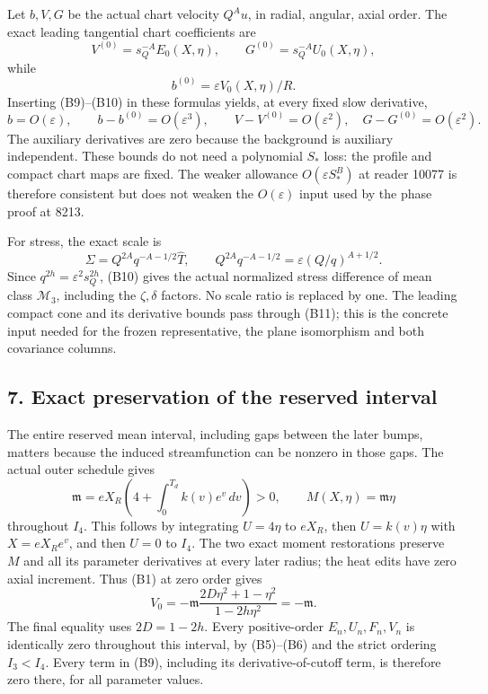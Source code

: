 \documentclass[10pt,a4paper]{article}
\begin{document}
Let \(b,V,G\) be the actual chart velocity \(Q^Au\), in radial, angular, axial order. The exact leading tangential chart coefficients are \[
V^{(0)}=s_Q^{-A}E_0(X,\eta),\qquad G^{(0)}=s_Q^{-A}U_0(X,\eta),
\] while \[
b^{(0)}=\varepsilon V_0(X,\eta)/R.
\] Inserting (B9)--(B10) in these formulas yields, at every fixed slow derivative, \[
b=O(\varepsilon),\qquad b-b^{(0)}=O(\varepsilon^3),
\qquad V-V^{(0)}=O(\varepsilon^2),\quad G-G^{(0)}=O(\varepsilon^2).
\tag{B12}
\] The auxiliary derivatives are zero because the background is auxiliary independent. These bounds do not need a polynomial \(S_*\) loss: the profile and compact chart maps are fixed. The weaker allowance \(O(\varepsilon S_*^B)\) at reader 10077 is therefore consistent but does not weaken the \(O(\varepsilon)\) input used by the phase proof at 8213.

For stress, the exact scale is \[
\Sigma=Q^{2A}q^{-A-1/2}\widehat T,
\qquad
Q^{2A}q^{-A-1/2}=\varepsilon(Q/q)^{A+1/2}.
\] Since \(q^{2h}=\varepsilon^2s_Q^{2h}\), (B10) gives the actual normalized stress difference of mean class \(\mathcal M_3\), including the \(\zeta,\delta\) factors. No scale ratio is replaced by one. The leading compact cone and its derivative bounds pass through (B11); this is the concrete input needed for the frozen representative, the plane isomorphism and both covariance columns.

\subsection{7. Exact preservation of the reserved interval}\label{gclosure:exact-preservation-of-the-reserved-interval}

The entire reserved mean interval, including gaps between the later bumps, matters because the induced streamfunction can be nonzero in those gaps. The actual outer schedule gives \[
\mathfrak m=eX_R\left(4+\int_0^{T_d}k(v)e^v\,dv\right)>0,
\qquad M(X,\eta)=\mathfrak m\eta
\] throughout \(I_4\). This follows by integrating \(U=4\eta\) to \(eX_R\), then \(U=k(v)\eta\) with \(X=eX_Re^v\), and then \(U=0\) to \(I_4\). The two exact moment restorations preserve \(M\) and all its parameter derivatives at every later radius; the heat edits have zero axial increment. Thus (B1) at zero order gives \[
V_0=-\mathfrak m\frac{2D\eta^2+1-\eta^2}{1-2h\eta^2}=-\mathfrak m.
\] The final equality uses \(2D=1-2h\). Every positive-order \(E_n,U_n,F_n,V_n\) is identically zero throughout this interval, by (B5)--(B6) and the strict ordering \(I_3<I_4\). Every term in (B9), including its derivative-of-cutoff term, is therefore zero there, for all parameter values.
\end{document}
